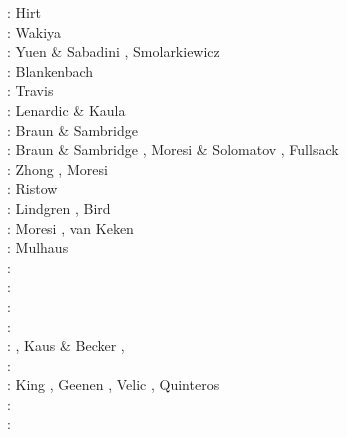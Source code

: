 \begin{scriptsize}
\nineteenseventyfour: Hirt \etal \cite{hiac74}\\
\nineteenseventyfive: Wakiya \cite{waki75a,waki75b}\\
\nineteeneightyfour: Yuen \& Sabadini \cite{yusa84}, Smolarkiewicz \cite{smol84}\\
\nineteeneightynine: Blankenbach \etal \cite{blbc89}\\
\nineteenninety: Travis \etal \cite{trab90}\\
\nineteenninetythree: Lenardic \& Kaula \cite{leka93}\\
\nineteenninetyfour: Braun \& Sambridge \cite{brsa94}\\
\nineteenninetyfive: Braun \& Sambridge \cite{brsa95}, Moresi \& Solomatov \cite{moso95}, 
                     Fullsack \cite{full95}\\
\nineteenninetysix: Zhong \cite{zhon96}, Moresi \etal \cite{mozg96}\\
\nineteenninetyseven: Ristow \cite{rist97}\\
\nineteenninetynine: Lindgren \cite{lind99}, Bird \cite{bird99}\\
\twothousandone: Moresi \etal\cite{modm01}, van Keken \cite{vank01}\\
\twothousandtwo: Mulhaus \etal \cite{mudm02}\\
\twothousandthree: \cite{taki03}\cite{modm03}\cite{geyu03}\cite{geyu03b}\cite{taxi03}\cite{scpo03}\\
\twothousandfour: \cite{kaps04}\cite{kasa04}\cite{kaks08}\cite{mumc04}\\
\twothousandfive: \cite{mure05}\\
\twothousandsix: \cite{kapo06}\cite{more06}\cite{onmm06}\cite{mudm06}\cite{tact06}\\
\twothousandseven: \cite{toma07}\cite{chcc07}, Kaus \& Becker \cite{kabe07}, \cite{kaks07}\cite{moql07}\cite{geyu07}\cite{dadh07}
      \cite{zldf07}\\
\twothousandeight: \cite{zhmt08}\cite{deka08}\cite{trub08}\cite{krdp08}\cite{mamo08}\cite{gepd98}
      \cite{vack08}\cite{heta08}\cite{brtf08}\cite{daks08}\cite{chzy08}\cite{tack08}\cite{hust08b}\\
\twothousandnine: King \cite{king09}, Geenen \etal \cite{geum09}, Velic \etal \cite{vemm09}, 
                  Quinteros \etal \cite{qurj09}\\
\twothousandten: \cite{kaus10}\cite{kamm10}\cite{egat10}\cite{kilv10}\\
\twothousandeleven: \cite{dumg11}\cite{uibb11}\cite{hegc11}\cite{muso11}\cite{dawk11}\cite{lemm11}\\

\end{scriptsize}
